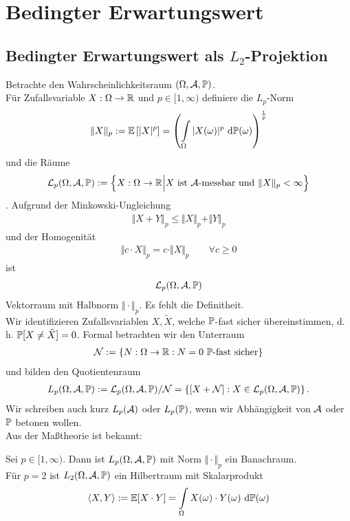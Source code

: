 \chapter{Bedingter Erwartungswert}
\section{Bedingter Erwartungswert als $L_2$-Projektion}
Betrachte den Wahrscheinlichkeitsraum $(\Omega,\A,\P)$.\\
Für Zufallsvariable $X:\Omega\to\R$ und $p\in[1,\infty)$ definiere die $L_p$-Norm
\begin{align*}
\Vert X\Vert_p:=\E\left[|X|^p\right]=\left(\int\limits_\Omega|X(\omega)|^p\d\P(\omega)\right)^{\frac{1}{p}}
\end{align*}
und die Räume
\begin{align*}
\mathcal{L}_p(\Omega,\A,\P):=\Big\lbrace X:\Omega\to\R\Big|X\text{ ist $\A$-messbar und }\Vert X\Vert_p<\infty\Big\rbrace
\end{align*}.
Aufgrund der Minkowski-Ungleichung
\begin{align*}
\Vert X+Y\Vert_p\leq\Vert X\Vert_p+\Vert Y\Vert_p
\end{align*}
und der Homogenität
\begin{align*}
\Vert c\cdot X\Vert_p=c\cdot\Vert X\Vert_p\qquad\forall c\geq0
\end{align*}
ist 
\begin{align*}
\mathcal{L}_p(\Omega,\A,\P)
\end{align*}
Vektorraum mit Halbnorm $\Vert\cdot\Vert_p$. Es fehlt die Definitheit.\\
Wir identifizieren Zufallsvariablen $X,\tilde{X}$, welche $\P$-fast sicher übereinstimmen, d. h. $\P[X\neq\tilde{X}]=0$. Formal betrachten wir den Unterraum
\begin{align*}
\mathcal{N}:=\lbrace N:\Omega\to\R:N=0\text{ $\P$-fast sicher}\rbrace
\end{align*}
und bilden den Quotientenraum
\begin{align*}
L_p(\Omega,\A,\P):=\mathcal{L}_p(\Omega,\A,\P)/\mathcal{N}=\left\lbrace[X+\mathcal{N}]:X\in\mathcal{L}_p(\Omega,\A,\P)\right\rbrace.
\end{align*}
Wir schreiben auch kurz $L_p(\A)$ oder $L_p(\P)$, wenn wir Abhängigkeit von $\A$ oder $\P$ betonen wollen.\\
Aus der Maßtheorie ist bekannt:

\begin{theorem}
Sei $p\in[1,\infty)$. Dann ist $L_p(\Omega,\A,\P)$ mit Norm $\Vert\cdot\Vert_p$ ein Banachraum.\\
Für $p=2$ ist $L_2(\Omega,\A,\P)$ ein Hilbertraum mit Skalarprodukt
\begin{align*}
\langle X,Y\rangle:=\E[X\cdot Y]=\int\limits_\Omega X(\omega)\cdot Y(\omega)\d\P(\omega)
\end{align*}
\end{theorem}

